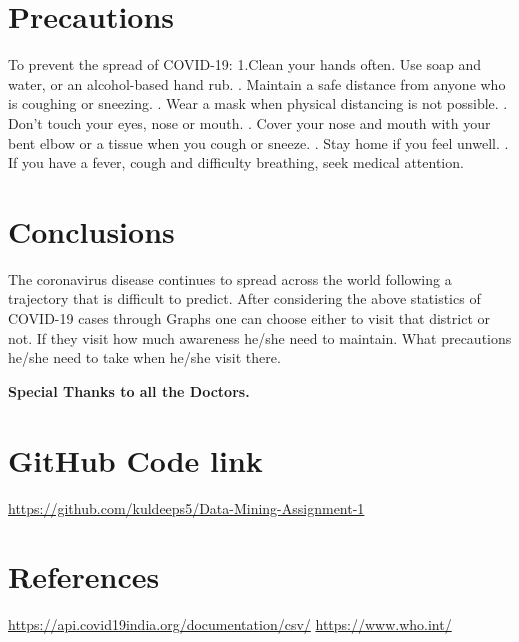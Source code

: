 \documentclass{report}
\begin{document}
\newpage
\section{Precautions}
\justify To prevent the spread of COVID-19: \newline
1.Clean your hands often. Use soap and water, or an alcohol-based hand rub. . Maintain a safe distance from anyone who is coughing or sneezing. . Wear a mask when physical distancing is not possible. . Don’t touch your eyes, nose or mouth. . Cover your nose and mouth with your bent elbow or a tissue when you cough or sneeze. . Stay home if you feel unwell. . If you have a fever, cough and difficulty breathing, seek medical attention. \newline

\section{Conclusions}
\justify The coronavirus disease continues to spread across the world following a trajectory that is difficult to predict. After considering the above statistics of COVID-19 cases through Graphs one can choose either to visit that district or not. If they visit how much awareness he/she need to maintain. What precautions he/she need to take when he/she visit there.
\newline \centerline{\textbf{Special Thanks to all the Doctors.}}
\section{GitHub Code link}
\href{https://github.com/kuldeeps5/Data-Mining-Assignment-1}{https://github.com/kuldeeps5/Data-Mining-Assignment-1}
\section{References}
\href{https://api.covid19india.org/documentation/csv/}{https://api.covid19india.org/documentation/csv/} \newline
\href{https://www.who.int/emergencies/diseases/novel-coronavirus-2019/advice-for-public}{https://www.who.int/}
\end{document}
